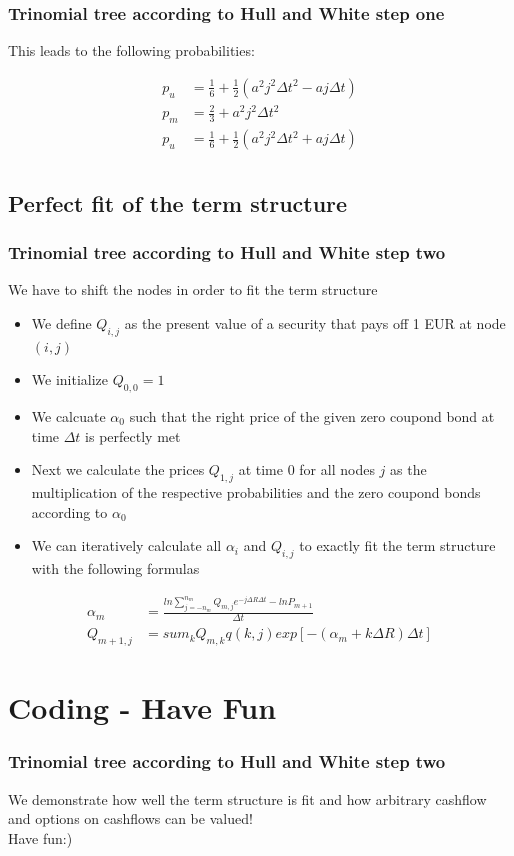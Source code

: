 \documentclass{beamer}
\begin{document}
\begin{frame}
\frametitle{Trinomial tree according to Hull and White step one} 

This leads to the following probabilities:

\begin{align*}
p_u &= \frac{1}{6} + \frac{1}{2}(a^2j^2 \Delta t^2 - a j \Delta t)\\
p_m &= \frac{2}{3} + a^2j^2 \Delta t^2 \\
p_u &= \frac{1}{6} + \frac{1}{2}(a^2j^2 \Delta t^2 + a j \Delta t)\\
\end{align*}

\end{frame}



\subsection{Perfect fit of the term structure}
\begin{frame}
\frametitle{Trinomial tree according to Hull and White step two} 
\vspace{0.4cm}
We have to shift the nodes in order to fit the term structure
\begin{itemize}
\item We define $Q_{i,j}$ as the present value of a security that pays off 1 EUR at node $(i,j)$
\item We initialize $Q_{0,0} = 1$
\item We calcuate $\alpha_0$ such that the right price of the given zero coupond bond at time $\Delta t$ is perfectly met
\item Next we calculate the prices $Q_{1,j}$ at time 0 for all nodes $j$ as the multiplication of the respective probabilities and the zero coupond bonds according to $\alpha_0$
\item We can iteratively calculate all $\alpha_i$ and $Q_{i,j}$ to exactly fit the term structure with the following formulas
\end{itemize}

\vspace{-0.6cm}

\begin{align*}
\alpha_m &= \frac{ln \sum_{j=-n_m}^{n_m} Q_{m,j} e^{-j\Delta R \Delta t} - ln P_{m+1}}{\Delta t}\\
Q_{m+1,j} &= sum_k Q_{m,k}q(k,j) exp[-(\alpha_m + k \Delta R) \Delta t]
\end{align*}

\end{frame}



\section{Coding - Have Fun}

\begin{frame}
\frametitle{Trinomial tree according to Hull and White step two} 
We demonstrate how well the term structure is fit and how arbitrary cashflow and options on cashflows can be valued!\\

Have fun:)
\end{frame}
\end{document}
